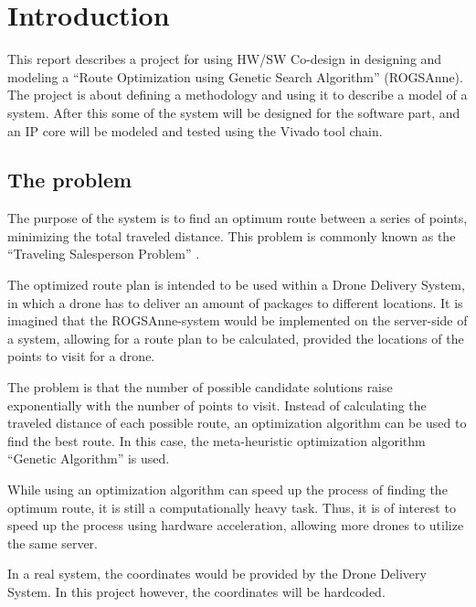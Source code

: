 
\chapter{Introduction}
This report describes a project for using HW/SW Co-design in designing and modeling a “Route Optimization using Genetic Search Algorithm” (ROGSAnne).
The project is about defining a methodology and using it to describe a model of a system. After this some of the system will be designed for the software part, and an IP core will be modeled and tested using the Vivado tool chain.

\section{The problem}
The purpose of the system is to find an optimum route between a series of points, minimizing the total traveled distance. This problem is commonly known as the “Traveling Salesperson Problem” \cite{wiki:TSP}.

The optimized route plan is intended to be used within a Drone Delivery System, in which a drone has to deliver an amount of packages to different locations. It is imagined that the ROGSAnne-system would be implemented on the server-side of a system, allowing for a route plan to be calculated, provided the locations of the points to visit for a drone.

The problem is that the number of possible candidate solutions raise exponentially with the number of points to visit. Instead of calculating the traveled distance of each possible route, an optimization algorithm can be used to find the best route. In this case, the meta-heuristic optimization algorithm “Genetic Algorithm” is used.

While using an optimization algorithm can speed up the process of finding the optimum route, it is still a computationally heavy task. Thus, it is of interest to speed up the process using hardware acceleration, allowing more drones to utilize the same server.

In a real system, the coordinates would be provided by the Drone Delivery System. In this project however, the coordinates will be hardcoded.